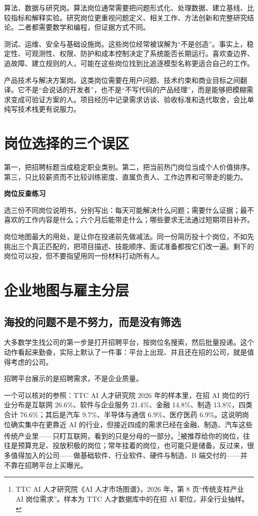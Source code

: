 \documentclass[UTF8,zihao=5,openany]{ctexbook}
\begin{document}
算法、数据与研究岗。算法岗位通常需要把问题形式化、处理数据、建立基线、比较指标和解释实验。研究岗位更重视问题定义、相关工作、方法创新和完整研究结论。二者都需要数学和编程，但证据方式不同。

测试、运维、安全与基础设施岗。这些岗位经常被误解为“不是创造”。事实上，稳定性、可观测性、权限、防护和成本控制决定了系统能否长期运行。喜欢查边界、追故障、建立规则的人，可能在这些岗位找到比追逐模型名称更适合自己的工作。

产品技术与解决方案岗。这类岗位需要在用户问题、技术约束和商业目标之间翻译。它不是“会说话的开发者”，也不是“不写代码的产品经理”，而是能够把模糊需求变成可验证方案的人。项目经历中记录需求访谈、验收标准和迭代取舍，会比单纯写技术栈更有说服力。

\section{岗位选择的三个误区}
第一，把招聘标题当成稳定职业类别。第二，把当前热门岗位当成个人价值排序。第三，只比较薪资而不比较训练密度、直属负责人、工作边界和可带走的能力。

\begin{toolbox}
\textbf{岗位反查练习}

选三份不同岗位说明书，分别写出：每天可能解决什么问题；需要什么证据；最不喜欢的工作内容是什么；六个月后能带走什么；哪些要求无法通过短期项目补齐。
\end{toolbox}

岗位地图最大的用处，是让你在投递前先做减法。同一份简历投十个岗位，不如先挑出三个真正匹配的，把项目描述、技能顺序、面试准备都按它们改一遍。剩下的岗位可以投，但不要指望用同一份材料打动所有人。

\section{企业地图与雇主分层}
\subsection{海投的问题不是不努力，而是没有筛选}
大多数学生找公司的第一步是打开招聘平台，按岗位名搜索，然后批量投递。这个动作看起来勤奋，实际上默认了一件事：平台上出现、并且还在招的公司，就是值得考虑的公司。

招聘平台展示的是招聘需求，不是企业质量。

一个可以核对的参照：TTC AI 人才研究院 2026 年的样本里，在招 AI 岗位的行业分布是互联网 26.6\%、软件与企业服务 21.4\%、金融 14.8\%、制造 13.8\%，四类合计 76.6\%；其后是汽车 9.7\%、半导体与通信 6.9\%、医疗医药 6.9\%。这说明岗位确实集中在更靠近 AI 的行业，但接近四成的需求已经在金融、制造、汽车这些传统产业里——只盯互联网，看到的只是分母的一部分。\footnote{TTC AI 人才研究院《AI 人才市场图谱》，2026 年，第 8 页“传统支柱产业 AI 岗位需求”。样本为 TTC 人才数据库中的在招 AI 职位，非全行业抽样。}被推荐给你的岗位，往往是预算充足、投放积极的岗位；常年挂着的岗位，也可能只是储备。反过来，很多值得加入的公司——做基础软件、行业软件、硬件与制造、B 端交付的——并不靠在招聘平台上买曝光。
\end{document}

